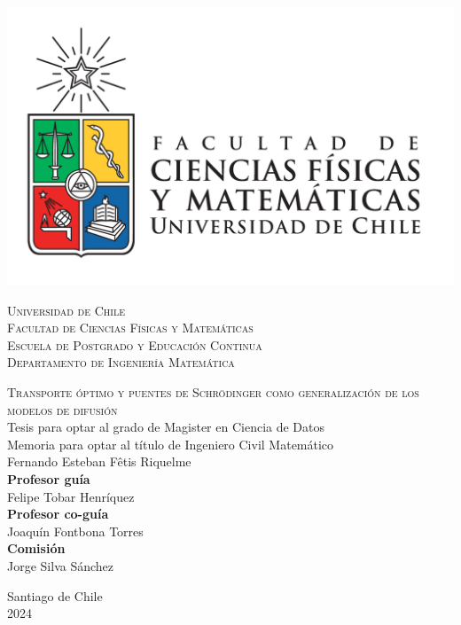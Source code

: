 \begin{titlepage}
	\hspace{0cm}\vspace{-2cm}
	\begin{LARGE}

		\begin{minipage}{0.14\linewidth}
			\vspace{-1.5cm}\hspace{-1cm}
			\includegraphics[width=1.2\textwidth]{images/uchile}
		\end{minipage}
		\hfill
		\begin{minipage}{0.85\linewidth}
			\vspace{1.1cm}
			{\scshape
				Universidad de Chile\\
				Facultad de Ciencias Físicas y Matemáticas\\
				Escuela de Postgrado y Educación Continua\\
				Departamento de Ingeniería Matemática\\
			}
		\end{minipage}

		\centering

		\vspace{1.3cm}
		{\Huge\scshape
			Transporte óptimo y puentes de Schrödinger como generalización de los modelos de difusión}\\
		\vspace{1.3cm}
		Tesis para optar al grado de Magister en Ciencia de Datos\\
		\vspace{0.1cm}
		Memoria para optar al título de Ingeniero Civil Matemático\\

		\vspace{1.3cm}
		{\huge Fernando Esteban Fêtis Riquelme}\\
		\vspace{1.3cm}
		\textbf{Profesor guía}\\
		Felipe Tobar Henríquez\\
		\textbf{Profesor co-guía}\\
		Joaquín Fontbona Torres\\
		\textbf{Comisión}\\
		Jorge Silva Sánchez

		\vfill
		Santiago de Chile\\2024

	\end{LARGE}

\end{titlepage}
